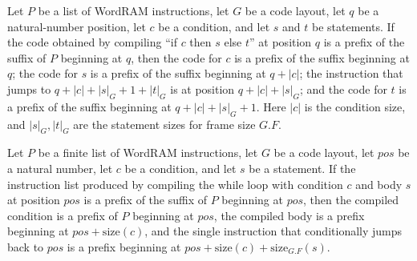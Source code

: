 \begin{theorem}
\label{Light.Compiler.codeAt_ite}
\leanok
{}
Let $P$ be a list of WordRAM instructions, let $G$ be a code layout, let $q$ be a
natural-number position, let $c$ be a condition, and let $s$ and $t$ be statements. If
the code obtained by compiling “if $c$ then $s$ else $t$” at position $q$ is a prefix of
the suffix of $P$ beginning at $q$, then the code for $c$ is a prefix of the suffix
beginning at $q$; the code for $s$ is a prefix of the suffix beginning at $q+|c|$; the
instruction that jumps to $q+|c|+|s|_G+1+|t|_G$ is at position $q+|c|+|s|_G$; and the
code for $t$ is a prefix of the suffix beginning at $q+|c|+|s|_G+1$. Here $|c|$ is the
condition size, and $|s|_G,|t|_G$ are the statement sizes for frame size $G.F$.
\end{theorem}

\begin{theorem}
\label{Light.Compiler.codeAt_while}
\leanok
{}
Let $P$ be a finite list of WordRAM instructions, let $G$ be a code layout, let $pos$ be
a natural number, let $c$ be a condition, and let $s$ be a statement. If the instruction
list produced by compiling the while loop with condition $c$ and body $s$ at position
$pos$ is a prefix of the suffix of $P$ beginning at $pos$, then the compiled condition
is a prefix of $P$ beginning at $pos$, the compiled body is a prefix beginning at $pos +
\mathrm{size}(c)$, and the single instruction that conditionally jumps back to $pos$ is
a prefix beginning at $pos + \mathrm{size}(c) + \mathrm{size}_{G.F}(s)$.
\end{theorem}

